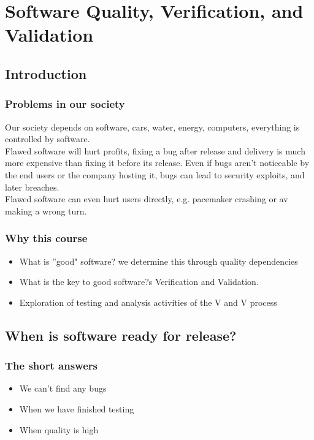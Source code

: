 \chapter{Software Quality, Verification, and Validation}
\section{Introduction}
\subsection{Problems in our society}
Our society depends on software, cars, water, energy, computers, everything is controlled by software.\\
Flawed software will hurt profits, fixing a bug after release and delivery is much more expensive than fixing it before its release. Even if bugs aren't noticeable by the end users or the company hosting it, bugs can lead to security exploits, and later breaches.\\
Flawed software can even hurt users directly, e.g. pacemaker crashing or av making a wrong turn.\\

\subsection{Why this course}
\begin{itemize}
	\item What is ''good" software?
	      \subitem we determine this through quality dependencies
	\item What is the key to good software?s
	      \subitem Verification and Validation.
	\item Exploration of testing and analysis activities of the V and V process
\end{itemize}

\section{When is software ready for release?}
\subsection{The short answers}
\begin{itemize}
	\item We can't find any bugs
	\item When we have finished testing
	\item When quality is high
\end{itemize}

